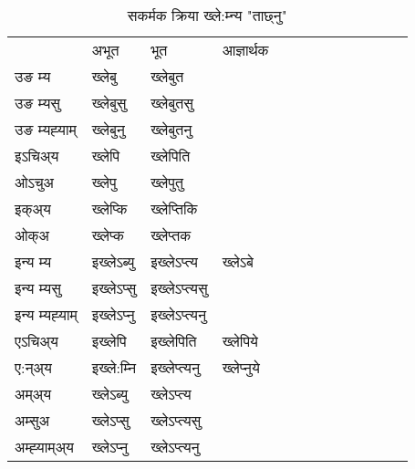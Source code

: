 \begin{table}[H]
\centering
\caption{\label{ep.vt} सकर्मक क्रिया  ख्ले:म्‍न्य  "ताछ्नु"  }
\begin{tabular}{l|l|l|l|l|l|l|l|l|l|l|l|l}  \toprule
&अभूत & भूत & आज्ञार्थक \\ 
उङ म्य &ख्लेबु &ख्लेबुत \\ 
उङ म्यसु &ख्लेबुसु &ख्लेबुतसु \\ 
उङ म्यह्‍याम् &ख्लेबुनु &ख्लेबुतनु \\ 
इऽचिअ्य  &ख्लेपि &ख्लेपिति   \\ 
ओऽचुअ &ख्लेपु &ख्लेपुतु   \\ 
इक्अ्य &ख्लेप्कि &ख्लेप्‍तिकि   \\ 
ओक्अ &ख्लेप्क &ख्लेप्‍तक   \\ 
इन्य म्य& इख्लेऽब्यु  & इख्लेऽप्‍त्य &ख्लेऽबे  \\ 
इन्य म्यसु & इख्लेऽप्सु  & इख्लेऽप्‍त्यसु   \\ 
इन्य म्यह्‍याम् & इख्लेऽप्‍नु  & इख्लेऽप्‍त्यनु   \\ 
एऽचिअ्य & इख्लेपि & इख्लेपिति &ख्लेपिये    \\ 
ए:न्अ्य & इख्ले:म्‍नि  & इख्लेप्‍त्यनु &ख्लेप्‍नुये  \\ 
अम्अ्य & ख्लेऽब्यु  & ख्लेऽप्‍त्य  \\ 
अम्सुअ & ख्लेऽप्सु & ख्लेऽप्‍त्यसु  \\ 
अम्ह्‍याम्अ्य & ख्लेऽप्‍नु  & ख्लेऽप्‍त्यनु \\ 
\bottomrule
\end{tabular}
\end{table}


